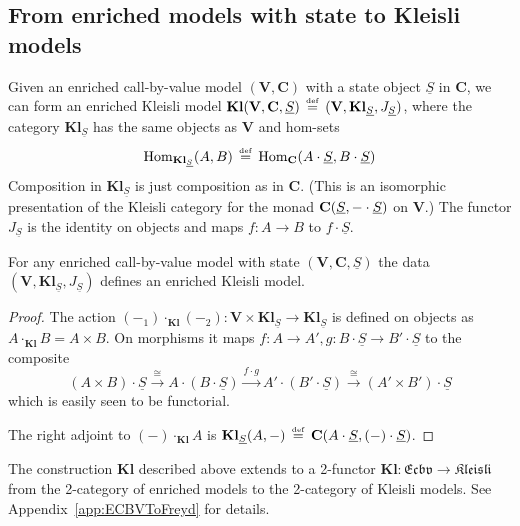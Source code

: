 \documentclass{LMCS}
\newcommand{\co}{\colon}
\newcommand{\VCat}{\fixedcatfont{V}} \newcommand{\CCat}{\fixedcatfont{C}} \newcommand{\DCat}{\fixedcatfont{D}}
\newcommand{\ltensor}[2]{#1 \cdot #2}
\newcommand{\fixedcatfont}{\mathbf}
\newcommand{\iso}{\cong}
\newcommand{\SA}{A}
\newcommand{\SB}{B}
\newcommand{\stateobj}{{\underline{S}}}
\newcommand{\Klmodel}{enriched Kleisli model}
\newcommand{\enrmodel}{enriched call-by-value model}
\newcommand{\CATECBV}{\TwoCatFont{Ecbv}}
\newcommand{\Freyd}{\TwoCatFont{Kleisli}}
\newcommand{\ECBVToFreyd}{\mathbf{Kl}}
\newcommand{\KlCat}[3]{\mathbf{Kl}_{#3}} \newcommand{\Klltensor}[2]{#1 \cdot_{\mathbf{Kl}} #2}
\newcommand{\KlHom}[3]{\KlCat{}{}{#1}(#2,#3)}
\newcommand{\TwoCatFont}[1]{\mathfrak{#1}}
\newcommand{\eqdef}{\defeq}
\newcommand{\defeq}{\mathrel{\,\stackrel{\mbox{\tiny{$\mathrm{def}$}}}=\,}}
\begin{document}
\subsection{From enriched models with state to Kleisli models}\label{sec:enrtokleisli}

Given an {\enrmodel} $(\VCat, \CCat)$ with a state object $\stateobj$
in $\CCat$, we can form an {\Klmodel} $\ECBVToFreyd(\VCat, \CCat,
\stateobj) \eqdef (\VCat, \KlCat{\VCat}{\CCat}{\stateobj},
J_{\stateobj})$, where the category $\KlCat{\VCat}{\CCat}{\stateobj}$
has the same objects as $\VCat$ and hom-sets
\[
\Homset{\KlCat{\VCat}{\CCat}{\stateobj}}{\SA}{\SB} \defeq 
\Homset{\CCat}{\ltensor{\SA}{\stateobj}}{\ltensor{\SB}{\stateobj}}
\]
Composition in $\KlCat{\VCat}{\CCat}{\stateobj}$ is just composition as in $\CCat$. (This is an isomorphic presentation of the Kleisli category for the monad $\CHom{\stateobj}{\ltensor{-}{\stateobj}}$ on $\VCat$.) The functor $J_{\stateobj}$ is the identity on objects and maps $f\co \SA \to \SB$ to  $\ltensor{f}{\stateobj}$.

\begin{lem} \label{lem:Kl:well-def}
For any {\enrmodel} with state $(\VCat, \CCat, \stateobj)$ the data $(\VCat, \KlCat{\VCat}{\CCat}{\stateobj}, J_{\stateobj})$ defines an {\Klmodel}.
\end{lem}

\begin{proof}
The action $\Klltensor{(-_1)}{(-_2)} \co \VCat \times \KlCat{\VCat}{\CCat}{\stateobj} \to \KlCat{\VCat}{\CCat}{\stateobj}$ is defined on objects as $\Klltensor{\SA}{\SB} = \SA \times \SB$. On morphisms it maps $f\co \SA \to \SA', g\co \ltensor{\SB}{\stateobj} \to \ltensor{\SB'}{\stateobj}$ to the composite
\[
\ltensor{(\SA \times \SB)}{\stateobj} \xrightarrow\iso \ltensor{\SA}{(\ltensor{\SB}{\stateobj})} \xrightarrow{\ltensor{f}g} 
\ltensor{\SA'}{(\ltensor{\SB'}{\stateobj})} \xrightarrow\iso \ltensor{(\SA' \times \SB')}{\stateobj}
\]
which is easily seen to be functorial. 

The right adjoint to $\Klltensor{(-)}{\SA}$ is $\KlHom{\stateobj}{\SA}{-} \eqdef \CHom{\ltensor{\SA}{\stateobj}}{\ltensor{(-)}{\stateobj}}$. \end{proof}

The construction $\ECBVToFreyd$ described above extends to a 2-functor $\ECBVToFreyd \co \CATECBV \to \Freyd$
from the 2-category of enriched models to the 2-category of 
Kleisli models.
See Appendix~\ref{app:ECBVToFreyd} for details.
\end{document}
